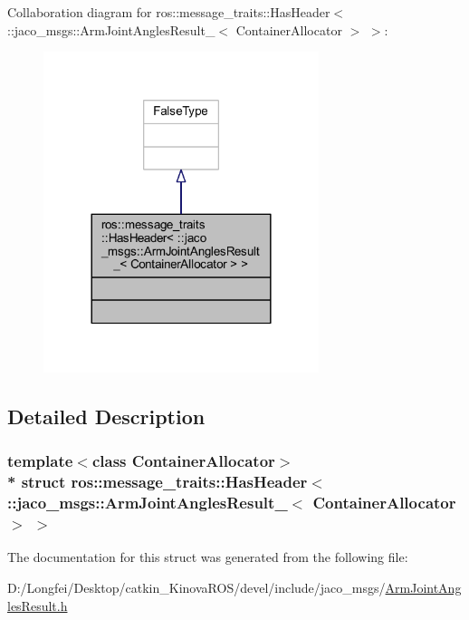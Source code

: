 Collaboration diagram for ros\+:\+:message\+\_\+traits\+:\+:Has\+Header$<$ \+:\+:jaco\+\_\+msgs\+:\+:Arm\+Joint\+Angles\+Result\+\_\+$<$ Container\+Allocator $>$ $>$\+:
\nopagebreak
\begin{figure}[H]
\begin{center}
\leavevmode
\includegraphics[width=228pt]{d8/de5/structros_1_1message__traits_1_1HasHeader_3_01_1_1jaco__msgs_1_1ArmJointAnglesResult___3_01Conta3cad1179202d1b39866ed539ddab9815}
\end{center}
\end{figure}


\subsection{Detailed Description}
\subsubsection*{template$<$class Container\+Allocator$>$\\*
struct ros\+::message\+\_\+traits\+::\+Has\+Header$<$ \+::jaco\+\_\+msgs\+::\+Arm\+Joint\+Angles\+Result\+\_\+$<$ Container\+Allocator $>$ $>$}



The documentation for this struct was generated from the following file\+:\begin{DoxyCompactItemize}
\item 
D\+:/\+Longfei/\+Desktop/catkin\+\_\+\+Kinova\+R\+O\+S/devel/include/jaco\+\_\+msgs/\hyperlink{ArmJointAnglesResult_8h}{Arm\+Joint\+Angles\+Result.\+h}\end{DoxyCompactItemize}
